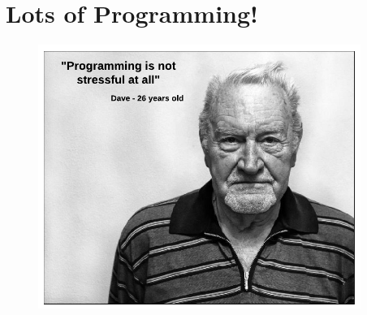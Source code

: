 \documentclass[usenames,11,dvipsnames,svgnames,x11names,aspectratio=1610,bibref]{beamer}
\renewcommand\sec{{\cnordSix{\secname}\hfill\mydisclaimer} }
\begin{document}
\section{Lots of Programming!}
\begin{frame}[fragile]{\sec}
\vspace*{\fill}
\begin{center} 
\begin{figure}
    \centering
    \includegraphics[width=10.5cm]{figures/lecture2/meme.pdf}
\end{figure}
    \end{center}
\vspace*{\fill}
\end{frame}


\end{document}
